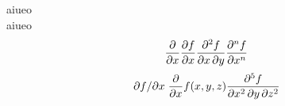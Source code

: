 \documentclass[paper=a4paper]{jlreq}
\begin{document}
aiueo\cite{Hemingway1952}\\
aiueo\\

\[
    \pdv{}{x}
    \pdv{f}{x}
    \pdv{f}{x, y}
    \pdv[order=n]{f}{x}
\]
\[
    \pdv{f}/{x}
    \pdv*{f(x,y,z)}{x}
    \pdv[order={2, 1, 2}]{f}{x, y, z}
\]

\\
\\
\printbibliography
\end{document}
